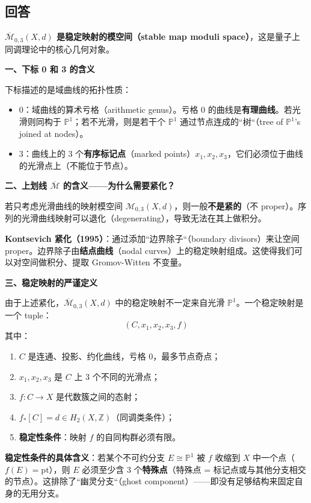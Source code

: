 \subsection{回答}
\textbf{$\overline{\mathcal{M}}_{0,3}(X,d)$ 是稳定映射的模空间（stable map moduli space）}，这是量子上同调理论中的核心几何对象。

\textbf{一、下标 0 和 3 的含义}

下标描述的是域曲线的拓扑性质：
\begin{itemize}
\item \textbf{$0$}：域曲线的算术亏格（arithmetic genus）。亏格 0 的曲线是\textbf{有理曲线}。若光滑则同构于 $\mathbb{P}^1$；若不光滑，则是若干个 $\mathbb{P}^1$ 通过节点连成的``树``（tree of $\mathbb{P}^1$'s joined at nodes）。
\item \textbf{$3$}：曲线上的 3 个\textbf{有序标记点}（marked points）$x_1, x_2, x_3$，它们必须位于曲线的光滑点上（不能位于节点）。
\end{itemize}

\textbf{二、上划线 $\overline{\mathcal{M}}$ 的含义——为什么需要紧化？}

若只考虑光滑曲线的映射模空间 $\mathcal{M}_{0,3}(X,d)$，则一般\textbf{不是紧的}（不 proper）。序列的光滑曲线映射可以退化（degenerating），导致无法在其上做积分。

\textbf{Kontsevich 紧化（1995）}：通过添加``边界除子``（boundary divisors）来让空间 proper。边界除子由\textbf{结点曲线}（nodal curves）上的稳定映射组成。这使得我们可以对空间做积分、提取 Gromov-Witten 不变量。

\textbf{三、稳定映射的严谨定义}

由于上述紧化，$\overline{\mathcal{M}}_{0,3}(X,d)$ 中的稳定映射不一定来自光滑 $\mathbb{P}^1$。一个稳定映射是一个 tuple：
$$(C, x_1, x_2, x_3, f)$$
其中：
\begin{enumerate}
\item $C$ 是连通、投影、约化曲线，亏格 0，最多节点奇点；
\item $x_1, x_2, x_3$ 是 $C$ 上 3 个不同的光滑点；
\item $f: C \to X$ 是代数簇之间的态射；
\item $f_*[C] = d \in H_2(X, \mathbb{Z})$（同调类条件）；
\item \textbf{稳定性条件}：映射 $f$ 的自同构群必须有限。
\end{enumerate}

\textbf{稳定性条件的具体含义}：若某个不可约分支 $E \cong \mathbb{P}^1$ 被 $f$ 收缩到 $X$ 中一个点（$f(E) = \mathrm{pt}$），则 $E$ 必须至少含 3 个\textbf{特殊点}（特殊点 = 标记点或与其他分支相交的节点）。这排除了``幽灵分支``（ghost component）——即没有足够结构来固定自身的无用分支。

